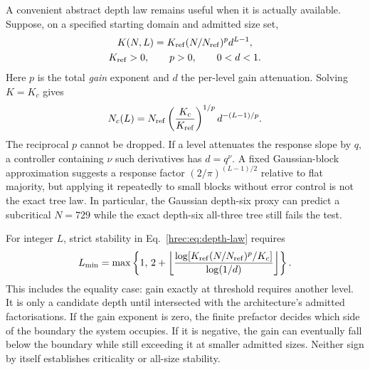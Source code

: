 A convenient abstract depth law remains useful when it is actually available. Suppose, on a specified starting domain and admitted size set,
\begin{equation}
 \begin{gathered}
 K(N,L)=K_{\rm ref}(N/N_{\rm ref})^p d^{L-1},\\
 K_{\rm ref}>0,\qquad p>0,\qquad 0<d<1.
 \end{gathered}
 \label{hrec:eq:depth-law}
\end{equation}
Here \(p\) is the total \emph{gain} exponent and \(d\) the per-level gain attenuation. Solving \(K=K_c\) gives
\begin{equation}
 N_c(L)=N_{\rm ref}
 \left(\frac{K_c}{K_{\rm ref}}\right)^{1/p}
 d^{-(L-1)/p}.
 \label{hrec:eq:critical-size}
\end{equation}
The reciprocal \(p\) cannot be dropped. If a level attenuates the response slope by \(q\), a controller containing \(\nu\) such derivatives has \(d=q^\nu\). A fixed Gaussian-block approximation suggests a response factor \((2/\pi)^{(L-1)/2}\) relative to flat majority, but applying it repeatedly to small blocks without error control is not the exact tree law. In particular, the Gaussian depth-six proxy can predict a subcritical \(N=729\) while the exact depth-six all-three tree still fails the test.

For integer \(L\), strict stability in Eq.~\eqref{hrec:eq:depth-law} requires
\begin{equation}
 L_{\min}=\max\left\{1,\,
 2+\left\lfloor
 \frac{\log[K_{\rm ref}(N/N_{\rm ref})^p/K_c]}{\log(1/d)}
 \right\rfloor\right\}.
 \label{hrec:eq:integer-floor}
\end{equation}
This includes the equality case: gain exactly at threshold requires another level. It is only a candidate depth until intersected with the architecture's admitted factorisations. If the gain exponent is zero, the finite prefactor decides which side of the boundary the system occupies. If it is negative, the gain can eventually fall below the boundary while still exceeding it at smaller admitted sizes. Neither sign by itself establishes criticality or all-size stability.

